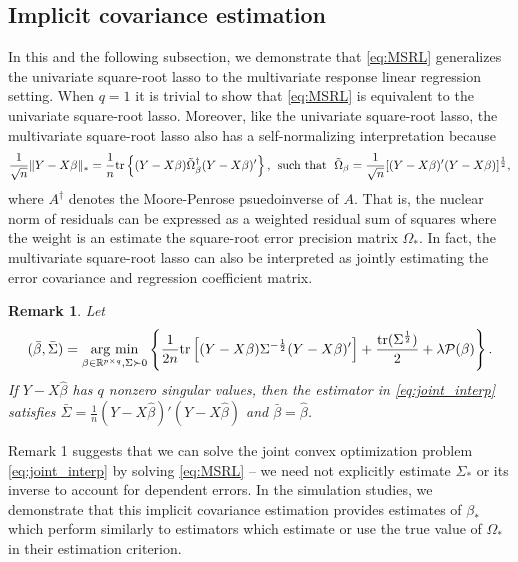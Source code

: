 \documentclass[12pt]{article}
\newcommand{\argmin}{\operatorname*{arg \ min}}
\newtheorem{remark}{Remark}
\begin{document}
\subsection{Implicit covariance estimation}
In this and the following subsection, we demonstrate that \eqref{eq:MSRL} generalizes the univariate square-root lasso to the multivariate response linear regression setting. When $q=1$ it is trivial to show that \eqref{eq:MSRL} is equivalent to the univariate square-root lasso. 
Moreover, like the univariate square-root lasso, the multivariate square-root lasso also has a self-normalizing interpretation because
$$ \frac{1}{\sqrt{n}}\| Y - X \beta\|_{*} = \frac{1}{n} {\rm tr}\left\{(Y - X\beta)\tilde{\Omega}_{\beta}^{\dagger}(Y - X\beta)'\right\}, \hspace{1pt} \text{ such that } \hspace{3pt} \tilde{\Omega}_{\beta} = \frac{1}{\sqrt{n}} [(Y - X\beta)'(Y - X\beta)]^{\frac{1}{2}},$$ where $A^{\dagger}$ denotes the Moore-Penrose psuedoinverse of $A$. That is, the nuclear norm of residuals can be expressed as a weighted residual sum of squares where the weight is an estimate the square-root error precision matrix $\Omega_*$. In fact, the multivariate square-root lasso can also be interpreted as jointly estimating the error covariance and regression coefficient matrix. 
\vspace{-5pt}
\begin{remark}\citep{van2016estimation}
Let
\begin{equation}\label{eq:joint_interp}
(\bar{\beta}, \bar{\Sigma}) = \argmin_{\beta \in \mathbb{R}^{p \times q}, \Sigma \succ 0} \left\{ \frac{1}{2n}{\rm tr} \left[ (Y - X\beta)\Sigma^{-\frac{1}{2}} (Y - X\beta)'\right] + \frac{{\rm tr}(\Sigma^{\frac{1}{2}})}{2}  + \lambda \mathcal{P}(\beta) \right\}.
\end{equation}
If $Y - X\hat{\beta}$ has $q$ nonzero singular values, then the estimator in \eqref{eq:joint_interp} satisfies $\bar{\Sigma} = \frac{1}{n} (Y-X\hat{\beta})'(Y - X \hat{\beta})$ and $\bar{\beta} = \hat{\beta}$. 
\end{remark}
Remark 1 suggests that we can solve the joint convex optimization problem \eqref{eq:joint_interp} by solving \eqref{eq:MSRL} -- we need not explicitly estimate $\Sigma_*$ or its inverse to account for dependent errors. In the simulation studies, we demonstrate that this implicit covariance estimation provides estimates of $\beta_*$ which perform similarly to estimators which estimate or use the true value of $\Omega_*$ in their estimation criterion. 
\end{document}

